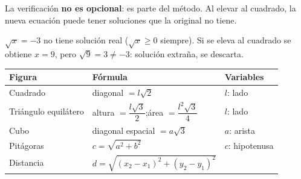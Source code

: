 \documentclass[11pt, letterpaper]{article}
\begin{document}
\begin{tcolorbox}[warningbox, title={Soluciones extrañas}]
La verificación \textbf{no es opcional}: es parte del método. Al elevar al cuadrado, la nueva ecuación puede tener soluciones que la original no tiene.

$\sqrt{x}=-3$ no tiene solución real ($\sqrt{x}\geq 0$ siempre). Si se eleva al cuadrado se obtiene $x=9$, pero $\sqrt{9}=3\neq -3$: solución extraña, se descarta.
\end{tcolorbox}

\begin{tcolorbox}[importantbox, title={Fórmulas geométricas con raíces}]
\begin{center}
\renewcommand{\arraystretch}{1.4}
\begin{tabular}{l|l|l}
\toprule
\textbf{Figura} & \textbf{Fórmula} & \textbf{Variables}\\
\midrule
Cuadrado & diagonal $=l\sqrt{2}$ & $l$: lado\\
Triángulo equilátero & altura $=\dfrac{l\sqrt{3}}{2}$;\quad área $=\dfrac{l^2\sqrt{3}}{4}$ & $l$: lado\\
Cubo & diagonal espacial $=a\sqrt{3}$ & $a$: arista\\
Pitágoras & $c=\sqrt{a^2+b^2}$ & $c$: hipotenusa\\
Distancia & $d=\sqrt{(x_2-x_1)^2+(y_2-y_1)^2}$ &\\
\bottomrule
\end{tabular}
\end{center}
\end{tcolorbox}
\end{document}
